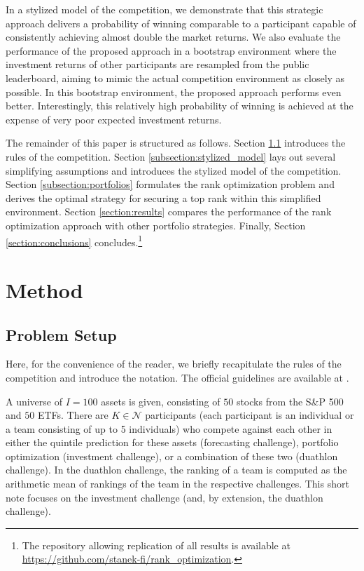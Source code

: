 \documentclass[3p,times,twocolumn]{elsarticle}
\begin{document}
In a stylized model of the competition, we demonstrate that this strategic approach delivers a probability of winning comparable to a participant capable of consistently achieving almost double the market returns.
We also evaluate the performance of the proposed approach in a bootstrap environment where the investment returns of other participants are resampled from the public leaderboard, aiming to mimic the actual competition environment as closely as possible.
In this bootstrap environment, the proposed approach performs even better.
Interestingly, this relatively high probability of winning is achieved at the expense of very poor expected investment returns.

The remainder of this paper is structured as follows.
Section \ref{subsection:problem_setup} introduces the rules of the competition.
Section \ref{subsection:stylized_model} lays out several simplifying assumptions and introduces the stylized model of the competition.
Section \ref{subsection:portfolios} formulates the rank optimization problem and derives the optimal strategy for securing a top rank within this simplified environment.
Section \ref{section:results} compares the performance of the rank optimization approach with other portfolio strategies.
Finally, Section \ref{section:conclusions} concludes.\footnote{
    The repository allowing replication of all results is available at \url{https://github.com/stanek-fi/rank_optimization}.
}

\section{Method}

\subsection{Problem Setup}\label{subsection:problem_setup}

Here, for the convenience of the reader, we briefly recapitulate the rules of the competition and introduce the notation.
The official guidelines are available at \citet{makridakisM6FinancialDuathlon2022}.

A universe of $I=100$ assets is given, consisting of $50$ stocks from the S\&P 500 and $50$ ETFs.
There are $K\in \mathcal{N}$ participants (each participant is an individual or a team consisting of up to 5 individuals) who compete against each other in either the quintile prediction for these assets (forecasting challenge), portfolio optimization (investment challenge), or a combination of these two (duathlon challenge).
In the duathlon challenge, the ranking of a team is computed as the arithmetic mean of rankings of the team in the respective challenges.
This short note focuses on the investment challenge (and, by extension, the duathlon challenge).
\end{document}
